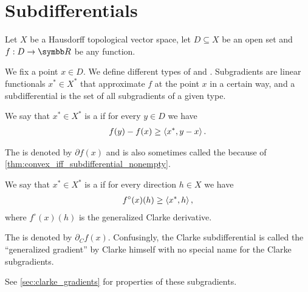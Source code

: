 \section{Subdifferentials}\label{sec:subdifferentials}

Let \( X \) be a Hausdorff topological vector space, let \( D \subseteq X \) be an open set and \( f: D \to \BB{R} \) be any function.

\begin{definition}\label{def:subdifferentials}
  We fix a point \( x \in D \). We define different types of  and . Subgradients are linear functionals \( x^* \in X^* \) that approximate \( f \) at the point \( x \) in a certain way, and a subdifferential is the set of all subgradients of a given type.

  \begin{defenum}
    \item\label{def:subdifferentials/convex}\cite[59]{Clarke2013} We say that \( x^* \in X^* \) is a  if for every \( y \in D \) we have
    \begin{align*}
      f(y) - f(x) \geq \left\langle x^*, y - x \right\rangle.
    \end{align*}

    The  is denoted by \( \partial f(x) \) and is also sometimes called the  because of \cref{thm:convex_iff_subdifferential_nonempty}.

    \item\label{def:subdifferentials/clarke}\cite[definition 10.3]{Clarke2013} We say that \( x^* \in X^* \) is a  if for every direction \( h \in X \) we have
    \begin{align*}
      f^\circ(x)(h) \geq \left\langle x^*, h \right\rangle,
    \end{align*}
    where \( f^\circ(x)(h) \) is the generalized Clarke derivative.

    The  is denoted by \( \partial_C f(x) \). Confusingly, the Clarke subdifferential is called the \enquote{generalized gradient} by Clarke himself with no special name for the Clarke subgradients.

    See \cref{sec:clarke_gradients} for properties of these subgradients.


\end{defenum}
\end{definition}
